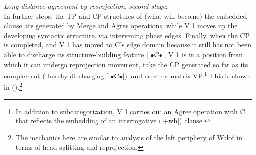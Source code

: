 \documentclass[output=paper
,modfonts
,nonflat]{langsci/langscibook}
\begin{document}
\ea\label{ex:mueller:33} {\itshape Long-distance agreement \label{Baum2}by reprojection, second
stage}:\\
\z
In further steps, the TP and CP structures of (what will become) the
embedded clause are generated by Merge and Agree operations, while V$\_$1 moves up
   the developing syntactic structure, via intervening phase
   edges. Finally, when the CP is completed, and V$\_$1 has moved to C's
   edge domain because it still has not been able to discharge its
   structure-building feature [{\small
    $\bullet$}C{\small $\bullet$}], V$\_$1 is in a position from which it
  can undergo reprojection movement, take the CP generated so far as
  its complement (thereby discharging [{\small
    $\bullet$}C{\small $\bullet$}]), and create a matrix
  VP.\footnote{In addition to subcategorization, V$\_$1 carries out an
    Agree operation with C that reflects the embedding of an
    interrogative ([+wh]) clause.} This is
  shown in (\Next).\footnote{The mechanics here are similar to 
    analysis of the left periphery of Wolof
   in terms of head splitting and reprojection.}   
\end{document}
